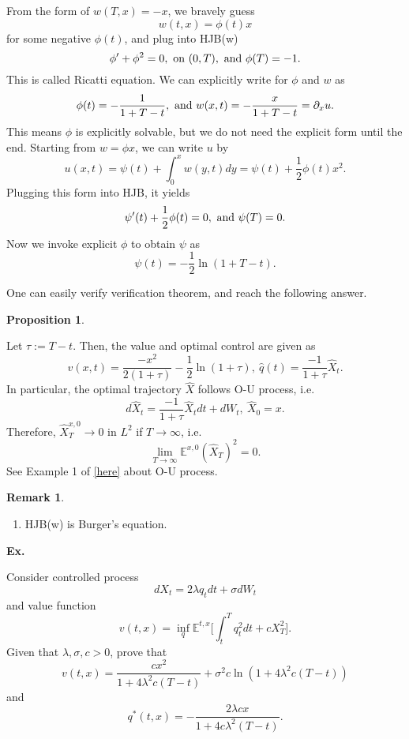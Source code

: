 \documentclass{article}
\newtheorem{proposition}[theorem]{Proposition}
\newtheorem{remark}[theorem]{Remark}
\begin{document}
From the form of $w(T, x) = - x$, we bravely guess $$w(t, x) = \phi(t) x$$ for 
some negative $\phi(t)$, and plug into HJB(w)
$$\phi' + \phi^{2}  = 0, \hbox{ on } (0, T), \hbox{ and } \phi(T) = -1.$$
This is called Ricatti equation. We can explicitly write for $\phi$ and $w$ as
\begin{equation}
 \label{eq:170810-phi}
\phi(t) = - \frac{1}{1 + T -t}, \hbox{ and } w(x, t) = - \frac{x}{1 + T -t } = \partial_{x} u.
\end{equation}
This means $\phi$ is explicitly solvable, 
but we do not need the explicit form until the end. Starting from $w = \phi x$, 
we can write $u$ by
$$u(x, t) = \psi(t) + \int_{0}^{x} w(y, t) dy = \psi(t) + \frac 1 2 \phi(t) x^{2}.$$
Plugging this form into HJB, it yields
$$\psi'(t) + \frac 1 2 \phi(t) = 0, \hbox{ and } \psi(T) = 0.$$
Now we invoke explicit $\phi$ to obtain $\psi$ as
\begin{equation}
 \label{eq:170810-psi}
 \psi(t) = - \frac 1 2 \ln ( 1 + T - t). 
\end{equation}



One can easily verify verification theorem, and reach the following answer.
\begin{proposition}
 
\end{proposition}
Let $\tau:= T - t$. Then, the value and optimal control are given as
$$v(x, t) =  \frac{- x^{2}}{2(1+ \tau)} - \frac 1 2 \ln (1 + \tau), 
\ 
\hat q(t) = \frac{-1}{1+ \tau} \hat X_{t}.$$ 
In particular, the optimal trajectory 
$\hat X$ follows O-U process, i.e. 
$$d \hat X_{t} = \frac{-1}{1+ \tau} \hat X_{t} dt + dW_{t}, \ \hat X_{0} = x.$$
Therefore, $\hat X_{T}^{x, 0} \to 0$ in $L^{2}$ if $T \to \infty$, i.e.
$$\lim_{T\to \infty}  \mathbb E^{x,0} (\hat X_{T})^{2} = 0.$$
See Example 1 of 
\href{https://01law.wordpress.com/2017/07/25/ornstein-uhlenbeck-process/#more-883}{[here]}
about O-U process.

\begin{remark}
 
\end{remark}
\begin{enumerate}
 \item HJB(w) is Burger's equation.
\end{enumerate}

{\bf Ex.}

Consider controlled process 
$$dX_{t} = 2 \lambda q_{t} dt + \sigma dW_{t}$$
and value function
$$v(t,x) = \inf_{q} \mathbb E^{t,x} \Big[\int_{t}^{T} q_{t}^{2} dt + c X_{T}^{2} \Big]. $$
Given that $\lambda, \sigma, c>0$, prove that
$$v(t, x) = \frac{cx^{2}}{1+4 \lambda^{2} c (T-t)} + \sigma^{2} c \ln (1+4 \lambda^{2} c (T-t))$$
and 
$$q^{*} (t,x) = - \frac{2\lambda c x}{1+4 c\lambda^{2} (T-t) }.$$
\end{document}
